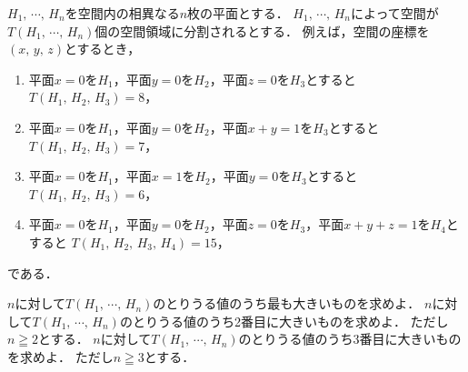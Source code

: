 \documentclass[../../main.tex]{subfiles}
\begin{document}
$H_1, \, \cdots, \, H_n$を空間内の相異なる$n$枚の平面とする．
$H_1, \, \cdots, \, H_n$によって空間が$T(H_1, \, \cdots, \, H_n)$個の空間領域に分割されるとする．
例えば，空間の座標を$(x, \, y, \, z)$とするとき，
\begin{enumerate}
  \item[●]平面$x=0$を$H_1$，平面$y=0$を$H_2$，平面$z=0$を$H_3$とすると$T(H_1, \, H_2, \, H_3)=8$，
  \item[●]平面$x=0$を$H_1$，平面$y=0$を$H_2$，平面$x+y=1$を$H_3$とすると$T(H_1, \, H_2, \, H_3)=7$，
  \item[●]平面$x=0$を$H_1$，平面$x=1$を$H_2$，平面$y=0$を$H_3$とすると$T(H_1, \, H_2, \, H_3)=6$，
  \item[●]平面$x=0$を$H_1$，平面$y=0$を$H_2$，平面$z=0$を$H_3$，平面$x+y+z=1$を$H_4$とすると
    $T(H_1, \, H_2, \, H_3, \, H_4)=15$，
\end{enumerate}
である．
\begin{enumerate}
  $n$に対して$T(H_1, \, \cdots, \, H_n)$のとりうる値のうち最も大きいものを求めよ．
  $n$に対して$T(H_1, \, \cdots, \, H_n)$のとりうる値のうち2番目に大きいものを求めよ．
    ただし$n\geqq2$とする．
  $n$に対して$T(H_1, \, \cdots, \, H_n)$のとりうる値のうち3番目に大きいものを求めよ．
    ただし$n\geqq3$とする．
\end{enumerate}
\end{document}
